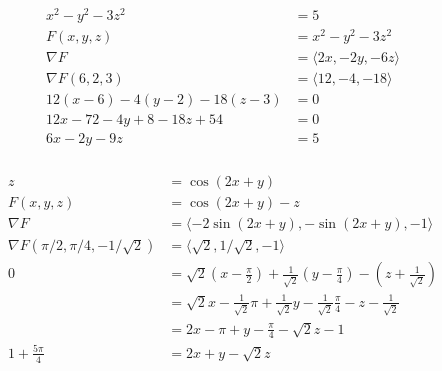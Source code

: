 \documentclass{article}
\begin{document}
\begin{align*}
  x^2 - y^2 - 3 z^2                   & = 5                               \\
  F(x, y, z)                          & = x^2 - y^2 - 3 z^2               \\
  \nabla F                            & = \langle 2 x, -2 y, -6 z \rangle \\
  \nabla F(6, 2, 3)                   & = \langle 12, -4, -18 \rangle     \\
  12 (x - 6) - 4 (y - 2) - 18 (z - 3) & = 0                               \\
  12 x - 72 - 4 y + 8 - 18 z + 54     & = 0                               \\
  6 x - 2 y - 9 z                     & = 5
\end{align*}

\setcounter{subsubsection}{20}
\subsubsection{}

\begin{align*}
  z                                         & = \cos (2 x + y)                                                                                                                          \\
  F(x, y, z)                                & = \cos (2 x + y) - z                                                                                                                      \\
  \nabla F                                  & = \langle -2 \sin (2 x + y), -\sin (2 x + y), -1 \rangle                                                                                  \\
  \nabla F(\pi / 2, \pi / 4, -1 / \sqrt{2}) & = \langle \sqrt{2}, 1 / \sqrt{2}, -1 \rangle                                                                                              \\
  0                                         & = \sqrt{2} \left( x - \frac{\pi}{2} \right) + \frac{1}{\sqrt{2}} \left( y - \frac{\pi}{4} \right) - \left( z + \frac{1}{\sqrt{2}} \right) \\
                                            & = \sqrt{2} x - \frac{1}{\sqrt{2}} \pi + \frac{1}{\sqrt{2}} y - \frac{1}{\sqrt{2}} \frac{\pi}{4} - z - \frac{1}{\sqrt{2}}                  \\
                                            & = 2 x - \pi + y - \frac{\pi}{4} - \sqrt{2} z - 1                                                                                          \\
  1 + \frac{5 \pi}{4}                       & = 2 x + y - \sqrt{2} z
\end{align*}
\end{document}
